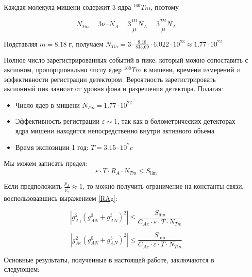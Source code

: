 \documentclass[a4paper,article,14pt]{extarticle}
\begin{document}
Каждая молекула мишени содержит 3 ядра $^{169}Tm$, поэтому

\begin{equation}
    N_{Tm} = 3\nu  \cdot {N_A} = 3\frac{m}{\mu }{N_A} = 3\frac{m}{\mu }{N_A}
\end{equation}

Подставляя $m=
8.18 \text{ г}$, получаем ${N_{Tm}} = 3 \cdot \frac{{8.18}}{{833.69}} \cdot 6.022 \cdot {10^{23}} \approx 1.77 \cdot {10^{22}}$


Полное число зарегистрированных событий в пике, который можно сопоставить с аксионом, пропорционально числу ядер $^{169}Tm$ в мишени, времени измерений и эффективности регистрации детектором. Вероятность зарегистрировать аксионный пик зависит от уровня фона и разрешения детектора. Полагая:
\begin{itemize}
    \item Число ядер в мишени $N_{Tm} = 1.77 \cdot {10^{22}}$
    \item Эффективность регистрации $\varepsilon \sim 1 $, так как в болометрических детекторах ядра мишени находится непосредственно внутри активного объема
    \item Время экспозиции 1 год: $T = 3.15 \cdot {10^7} c$
\end{itemize}

Мы можем записать предел:
\begin{equation}
   \varepsilon  \cdot T \cdot {R_A} \cdot N_{Tm} \leqslant {S_{\lim }}
\end{equation}

Если предположить $\frac{{{p_A}}}{{{p_\gamma}}} \approx 1$, то можно получить ограничение на константы связи, воспользовавшись выражением \eqref{RAg}:

\begin{equation}
     \left| g_{A\gamma}^2{\left( {g_{AN}^0 + g_{AN}^3} \right)^2} \right| \leqslant \frac{{S_{\lim }}}{{C_{Ax}} \cdot \varepsilon  \cdot T \cdot N_{Tm} } 
\end{equation}


\begin{equation}
     \left| g_{Ae}^2{\left( {g_{AN}^0 + g_{AN}^3} \right)^2} \right| \leqslant \frac{{S_{\lim }}}{{C_{Ae}} \cdot \varepsilon  \cdot T \cdot N_{Tm} } 
\end{equation}

Основные результаты, полученные в настоящей работе, заключаются в следующем:
\end{document}
